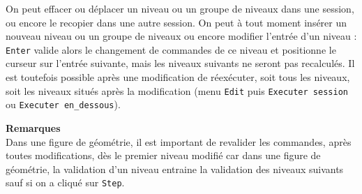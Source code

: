 \documentclass[a4paper,11pt]{article}
\begin{document}
On peut effacer ou d\'eplacer un niveau ou un groupe de niveaux
dans une session, ou encore le recopier dans une autre session.
On peut \`a tout moment ins\'erer un nouveau niveau  ou un groupe de niveaux
ou encore modifier l'entr\'ee d'un niveau : {\tt Enter} valide alors le 
changement de commandes de ce niveau et positionne le curseur sur l'entr\'ee 
suivante, mais les niveaux suivants ne seront pas recalcul\'es. Il est 
toutefois possible apr\`es une modification de r\'eex\'ecuter, soit tous les 
niveaux, soit les niveaux situ\'es apr\`es la modification (menu {\tt Edit} 
puis {\tt Executer session}  ou {\tt Executer en\_dessous}).

{\bf Remarques}\\
Dans une figure de g\'eom\'etrie, il est important de revalider les commandes,
apr\`es toutes modifications, d\`es le premier niveau modifi\'e car dans une 
figure de g\'eom\'etrie, la validation d'un niveau entraine la validation des 
niveaux suivants sauf si on a cliqu\'e sur {\tt Step}.
\end{document}
